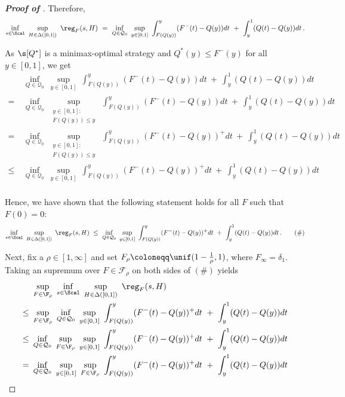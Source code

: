 \begin{proof}[\textbf{Proof of }]
	Therefore,
	\begin{align*}
		\inf_{s \in \Scal}\ \sup_{H \in \Delta([0,1])}\ \reg_F(s,H)\ =\ \inf_{Q\in \mathcal Q_0}\ \sup_{y \in [0,1]}\ \int_{F(Q(y))}^y (F^-(t) - Q(y)) dt\ +\ \int_y^1 (Q(t) - Q(y)) dt\,.
	\end{align*}
	
	As $\s[Q^*]$ is a minimax-optimal strategy and $Q^*(y) \leq F^-(y)$ for all $y \in [0,1]$, we get
	\begin{align*}
		&\inf_{Q\in \mathcal Q_0}\ \sup_{y \in [0,1]}\ \int_{F(Q(y))}^y (F^-(t) - Q(y)) dt\ +\ \int_y^1 (Q(t) - Q(y)) dt\\
		=\ &\inf_{Q\in \mathcal Q_0}\ \sup_{\substack{y \in [0,1]: \\ F(Q(y)) \leq y}}\ \int_{F(Q(y))}^y (F^-(t) - Q(y)) dt\ +\ \int_y^1 (Q(t) - Q(y)) dt\\
		=\ &\inf_{Q\in \mathcal Q_0}\ \sup_{\substack{y \in [0,1]: \\ F(Q(y)) \leq y}}\ \int_{F(Q(y))}^y (F^-(t) - Q(y))^+ dt\ +\ \int_y^1 (Q(t) - Q(y)) dt\\
		\leq\ &\inf_{Q\in \mathcal Q_0}\ \sup_{y \in [0,1]}\ \int_{F(Q(y))}^y (F^-(t) - Q(y))^+ dt\ +\ \int_y^1 (Q(t) - Q(y)) dt\\
	\end{align*}
	
	Hence, we have shown that the following statement holds for all $F$ such that $F(0) = 0$:
	\begin{align*}
		\inf_{s \in \Scal}\ \sup_{H \in \Delta([0,1])}\ \reg_F(s,H)\ \leq\ \inf_{Q\in \mathcal Q_0}\ \sup_{y \in [0,1]}\ \int_{F(Q(y))}^y (F^-(t) - Q(y))^+ dt\ +\ \int_y^1 (Q(t) - Q(y)) dt\,. \tag{\#}
	\end{align*}
	
	Next, fix a $\rho \in [1,\infty]$ and set $F_\rho \coloneqq \unif(1 - \tfrac{1}{\rho}, 1)$, where $F_\infty = \delta_1$. Taking an supremum over $F \in \mathcal F_\rho$ on both sides of $(\#)$ yields
	\begin{align*}
		&\sup_{F \in \F_\rho}\ \inf_{s \in \Scal}\ \sup_{H \in \Delta([0,1])}\ \reg_F(s,H)\\
		\leq\ &\sup_{F \in \F_\rho}\ \inf_{Q\in \mathcal Q_0}\ \sup_{y \in [0,1]}\ \int_{F(Q(y))}^y (F^-(t) - Q(y))^+ dt\ +\ \int_y^1 (Q(t) - Q(y)) dt\\
		\leq\ &\inf_{Q\in \mathcal Q_0}\ \sup_{F \in \F_\rho}\  \sup_{y \in [0,1]}\ \int_{F(Q(y))}^y (F^-(t) - Q(y))^+ dt\ +\ \int_y^1 (Q(t) - Q(y)) dt\\
		=\ &\inf_{Q\in \mathcal Q_0}\ \sup_{y \in [0,1]}\ \sup_{F \in \F_\rho}\   \int_{F(Q(y))}^y (F^-(t) - Q(y))^+ dt\ +\ \int_y^1 (Q(t) - Q(y)) dt
	\end{align*}
	

\end{proof}
